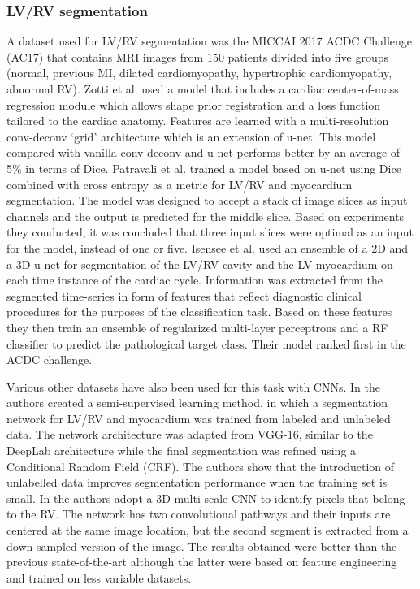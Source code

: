 \documentclass[journal]{IEEEtran}
\begin{document}
\subsubsection{LV/RV segmentation}
A dataset used for LV/RV segmentation was the MICCAI 2017 ACDC Challenge (AC17) that contains MRI images from 150 patients divided into five groups (normal, previous MI, dilated cardiomyopathy, hypertrophic cardiomyopathy, abnormal RV).
Zotti et al.\cite{zotti2017gridnet} used a model that includes a cardiac center-of-mass regression module which allows shape prior registration and a loss function tailored to the cardiac anatomy.
Features are learned with a multi-resolution conv-deconv `grid' architecture which is an extension of u-net.
This model compared with vanilla conv-deconv and u-net performs better by an average of 5\% in terms of Dice.
Patravali et al.\cite{patravali20172d} trained a model based on u-net using Dice combined with cross entropy as a metric for LV/RV and myocardium segmentation.
The model was designed to accept a stack of image slices as input channels and the output is predicted for the middle slice.
Based on experiments they conducted, it was concluded that three input slices were optimal as an input for the model, instead of one or five.
Isensee et al.\cite{isensee2017automatic} used an ensemble of a 2D and a 3D u-net for segmentation of the LV/RV cavity and the LV myocardium on each time instance of the cardiac cycle.
Information was extracted from the segmented time-series in form of features that reflect diagnostic clinical procedures for the purposes of the classification task.
Based on these features they then train an ensemble of regularized multi-layer perceptrons and a RF classifier to predict the pathological target class.
Their model ranked first in the ACDC challenge.

Various other datasets have also been used for this task with CNNs.
In\cite{bai2017semi} the authors created a semi-supervised learning method, in which a segmentation network for LV/RV and myocardium was trained from labeled and unlabeled data.
The network architecture was adapted from VGG-16, similar to the DeepLab architecture\cite{chen2018deeplab} while the final segmentation was refined using a Conditional Random Field (CRF)\@.
The authors show that the introduction of unlabelled data improves segmentation performance when the training set is small.
In\cite{giannakidis2016fast} the authors adopt a 3D multi-scale CNN to identify pixels that belong to the RV\@.
The network has two convolutional pathways and their inputs are centered at the same image location, but the second segment is extracted from a down-sampled version of the image.
The results obtained were better than the previous state-of-the-art although the latter were based on feature engineering and trained on less variable datasets.
\end{document}
